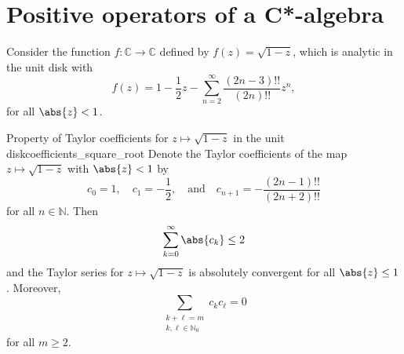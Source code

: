 \section{Positive operators of a C*-algebra}
Consider the function \(f : \mathbb{C} \to \mathbb{C}\) defined by \(f(z) = \sqrt{1 - z}\), which is analytic in the unit disk with
\begin{equation*}
    f(z) = 1 - \frac12z - \sum_{n = 2}^\infty \frac{(2n - 3)!!}{(2n)!!} z^n,
\end{equation*}
for all \(\abs{z} < 1\).
\begin{lemma}{Property of Taylor coefficients for \(z \mapsto \sqrt{1 - z}\) in the unit disk}{coefficients_square_root}
    Denote the Taylor coefficients of the map \(z \mapsto \sqrt{1-z}\) with \(\abs{z} < 1\) by
    \begin{equation*}
        c_0 = 1,\quad c_1 = -\frac12,\quad\text{and}\quad c_{n+1} = -\frac{(2n-1)!!}{(2n+2)!!}
    \end{equation*}
    for all \(n \in \mathbb{N}\). Then
    \begin{equation*}
        \sum_{k = 0}^\infty \abs{c_k} \leq 2
    \end{equation*}
    and the Taylor series for \(z \mapsto \sqrt{1-z}\) is absolutely convergent for all \(\abs{z} \leq 1\). Moreover,
    \begin{equation*}
        \sum_{\substack{k + \ell = m\\k,\ell \in \mathbb{N}_0}}{c_k c_\ell} = 0
    \end{equation*}
    for all \(m \geq 2\).
\end{lemma}
